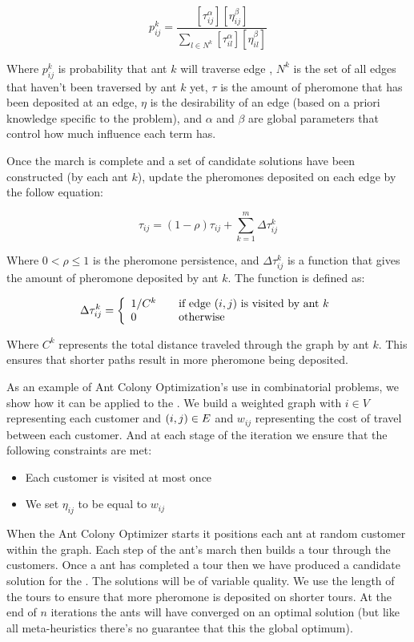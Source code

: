 \[
   p_{ij}^k = \frac{ [\tau_{ij}^{\alpha}] [\eta_{ij}^{\beta}] }{ \sum_{l \in N^k} [\tau_{il}^{\alpha}] [\eta_{il}^{\beta}] }
\]

Where $p_{ij}^k$ is probability that ant $k$ will traverse edge , $N^k$ is the set of all edges that haven't been traversed by ant $k$ yet, $\tau$ is the amount of pheromone that has been deposited at an edge, $\eta$ is the desirability of an edge (based on a priori knowledge specific to the problem), and $\alpha$ and $\beta$ are global parameters that control how much influence each term has.

Once the march is complete and a set of candidate solutions have been constructed (by each ant $k$), update the pheromones deposited on each edge by the follow equation:

\[
   \tau_{ij} = (1 - \rho) \tau_{ij} + \sum_{k=1}^m \Delta \tau_{ij}^k
\]

Where $0 < \rho \le 1$ is the pheromone persistence, and $\Delta \tau_{ij}^k$ is a function that gives the amount of pheromone deposited by ant $k$. The function is defined as:

\[
   \Delta \tau_{ij}^k = \left\{
   \begin{array}{l l}
     1 / C^k & \quad \text{if edge $(i,j)$ is visited by ant $k$} \\
     0       & \quad \text{otherwise} \\
   \end{array} \right.
\]

Where $C^k$ represents the total distance traveled through the graph by ant $k$. This ensures that shorter paths result in more pheromone being deposited.

As an example of Ant Colony Optimization's use in combinatorial problems, we show how it can be applied to the \TSP. We build a weighted graph with $i \in V$ representing each customer and $(i,j) \in E$ and $w_{ij}$ representing the cost of travel between each customer. And at each stage of the iteration we ensure that the following constraints are met:

\begin{itemize}
   \item Each customer is visited at most once
   \item We set $\eta_{ij}$ to be equal to $w_{ij}$
\end{itemize}

When the Ant Colony Optimizer starts it positions each ant at random customer within the graph. Each step of the ant's march then builds a tour through the customers. Once a ant has completed a tour then we have produced a candidate solution for the \TSP. The solutions will be of variable quality. We use the length of the tours to ensure that more pheromone is deposited on shorter tours. At the end of $n$ iterations the ants will have converged on an optimal solution (but like all meta-heuristics there's no guarantee that this the global optimum).

